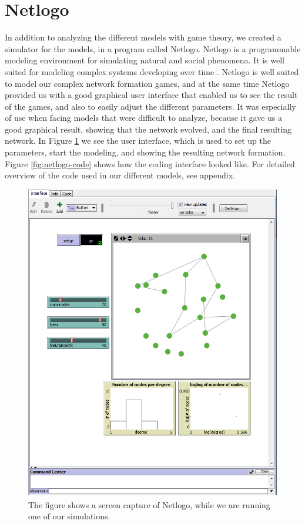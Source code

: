 \section{Netlogo}
In addition to analyzing the different models with game theory, we created a simulator for the models, in a program called Netlogo. Netlogo is a programmable modeling environment for simulating natural and social phenomena. It is well suited for modeling complex systems developing over time \cite{netlogo}.
Netlogo is well suited to model our complex network formation games, and at the same time Netlogo provided us with a good graphical user interface that enabled us to see the result of the games, and also to easily adjust the different parameters. It was especially of use when facing models that were difficult to analyze, because it gave us a good graphical result, showing that the network evolved, and the final resulting network.  
In Figure \ref{fig:netlogo} we see the user interface, which is used to set up the parameters, start the modeling, and showing the resulting network formation. Figure \ref{fig:netlogo-code} shows how the coding interface looked like. For detailed overview of the code used in our different models, see appendix.
\begin{figure}[h]
\centering
  \includegraphics[width=0.9\linewidth]{../Figures/netlogoexample.png}
  \caption{\label{fig:netlogo} The figure shows a screen capture of Netlogo, while we are running one of our simulations.}

\end{figure}
